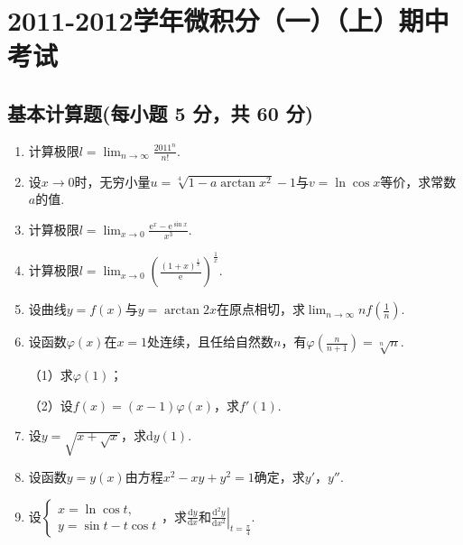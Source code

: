 \documentclass[../Main.tex]{subfiles}
\begin{document}
\chapter{2011-2012学年微积分（一）（上）期中考试}

\section{基本计算题(每小题 5 分，共 60 分)}
\begin{enumerate}
    \item 计算极限$l=\lim_{n\to\infty}\frac{2011^{n}}{n!}$.
          \vspace{7em}

    \item 设$x\to0$时，无穷小量$u=\sqrt[4]{1-a\arctan x^{2}}-1$与$v=\ln\cos x$等价，求常数$a$的值.
          \vspace{7em}

    \item 计算极限$l=\lim_{x\to 0}\frac{\mathrm{e}^{x}-\mathrm{e}^{\sin x}}{x^{3}}$.
          \vspace{8em}

    \item 计算极限$l=\lim_{x\to 0}\left(\frac{(1+x)^{\frac{1}{x}}}{\mathrm{e}}\right
              )^{\frac{1}{x}}$.
          \vspace{8em}

    \item 设曲线$y=f(x)$与$y=\arctan 2x$在原点相切，求$\lim_{n\to\infty}nf\left(\frac{1}{n}
              \right)$.
          \vspace{9em}

    \item 设函数$\varphi(x)$在$x=1$处连续，且任给自然数$n$，有$\varphi\left(\frac{n}{n+1}
              \right)=\sqrt[n]{n}$.

          （1）求$\varphi(1)$；

          （2）设$f(x)=(x-1)\varphi(x)$，求$f'(1)$.
          \vspace{9em}

    \item 设$y=\sqrt{x+\sqrt{x}}$，求$\mathrm{d}y(1)$.
          \vspace{9em}

    \item 设函数$y=y(x)$由方程$x^{2}-xy+y^{2}=1$确定，求$y'$，$y''$.
          \vspace{9em}

    \item 设$\begin{cases}
                  x=\ln\cos t, \\
                  y=\sin t-t\cos t
              \end{cases}$，求$\frac{\mathrm{d}y}{\mathrm{d}x}$和$\left.\frac{\mathrm{d}^{2}
                  y}{\mathrm{d}x^{2}}\right|_{t=\frac{\pi}{4}}$.
          \vspace{9em}


\end{enumerate}
\end{document}
